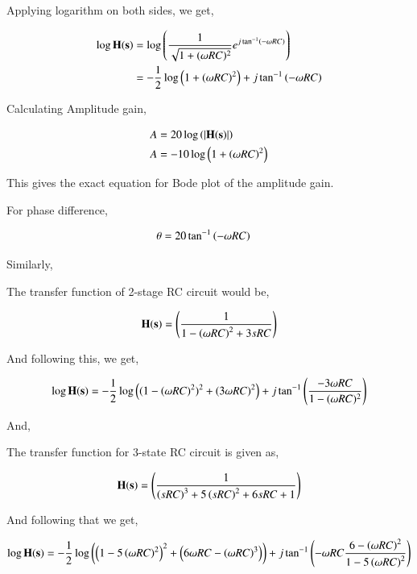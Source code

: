 \documentclass[journal]{IEEEtran}
\begin{document}
Applying logarithm on both sides, we get,

\begin{align*}
    \log{\mathbf{H(s)}} &= \log\left(\frac{1}{\sqrt{1+(\omega RC)^2}} e^{j\tan^{-1}\left(-\omega RC\right)}\right)\\
                  &= -\frac{1}{2}\log\left(1+(\omega RC)^2\right) + j \tan^{-1}\left(-\omega RC\right)
\end{align*}

Calculating Amplitude gain,

\begin{align*}
    A &= 20 \log\left(\left\vert\mathbf{H(s)}\right\vert\right)\\
    A &= -10 \log\left(1+\left(\omega RC\right)^2\right)
\end{align*}

This gives the exact equation for Bode plot of the amplitude gain.

For phase difference,

\begin{align*}
    \theta &= 20\tan^{-1}\left(-\omega RC\right)
\end{align*}


Similarly,

The transfer function of 2-stage RC circuit would be,

\begin{align*}
    \mathbf{H(s)} = \left(\frac{1}{1-\left(\omega RC\right)^2 + 3sRC}\right)
\end{align*}

And following this, we get,

\begin{align*}
    \log\mathbf{H(s)} = -\frac{1}{2}\log\left((1-(\omega RC)^2)^2 + (3\omega RC)^2\right) + j \tan^{-1}\left(\frac{-3\omega RC}{1-(\omega RC)^2}\right)
\end{align*}

And,

The transfer function for 3-state RC circuit is given as,

\begin{align*}
    \mathbf{H(s)} = \left(\frac{1}{\left(sRC\right)^3+5\left(sRC\right)^2+6sRC+1}\right)
\end{align*}

And following that we get,

\begin{align*}
    \log{\mathbf{H(s)}} = -\frac{1}{2}\log\left(\left(1-5\left(\omega RC\right)^2\right)^2+\left(6\omega RC - \left(\omega RC\right)^3\right)\right) + j \tan^{-1}\left(-\omega RC\frac{6-\left(\omega RC\right)^2}{1-5\left(\omega RC\right)^2}\right)
\end{align*}
\end{document}
